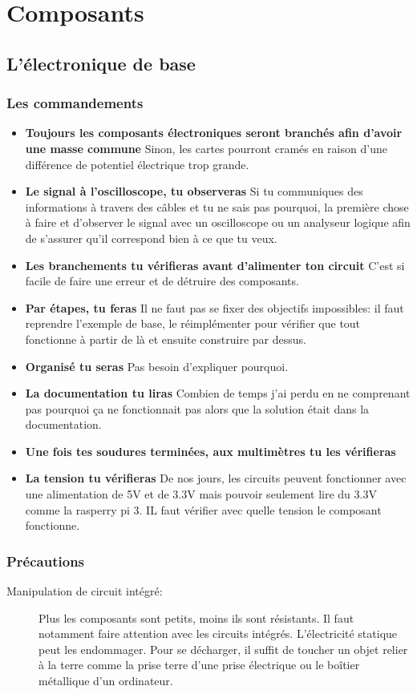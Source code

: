 \documentclass[a4paper, 11pt]{report}
\begin{document}
\part{Composants}

\chapter{L'électronique de base}

\section{Les commandements}
\begin{itemize}
\item \textbf{Toujours les composants électroniques seront branchés afin d'avoir une masse commune}
Sinon, les cartes pourront cramés en raison d'une différence de potentiel électrique trop grande.
\item \textbf{Le signal à l'oscilloscope, tu observeras}
Si tu communiques des informations à travers des câbles et tu ne sais pas pourquoi, la première chose à faire et d'observer le signal avec un oscilloscope ou un analyseur logique afin de s'assurer qu'il correspond bien à ce que tu veux.
\item \textbf{Les branchements tu vérifieras avant d'alimenter ton circuit}
C'est si facile de faire une erreur et de détruire des composants.
\item \textbf{Par étapes, tu feras}
Il ne faut pas se fixer des objectifs impossibles: il faut reprendre l'exemple de base, le réimplémenter pour vérifier que tout fonctionne à partir de là et ensuite construire par dessus.
\item \textbf{Organisé tu seras}
Pas besoin d'expliquer pourquoi.
\item \textbf{La documentation tu liras}
Combien de temps j'ai perdu en ne comprenant pas pourquoi ça ne fonctionnait pas alors que la solution était dans la documentation.
\item \textbf{Une fois tes soudures terminées, aux multimètres tu les vérifieras}
\item \textbf{La tension tu vérifieras}
De nos jours, les circuits peuvent fonctionner avec une alimentation de 5V et de 3.3V mais pouvoir seulement lire du 3.3V comme la rasperry pi 3. IL faut vérifier avec quelle tension le composant fonctionne.
\end{itemize}

\section{Précautions}
\begin{description}
\item[Manipulation de circuit intégré:] Plus les composants sont petits, moins ils sont résistants. Il faut notamment faire attention avec les circuits intégrés. L'électricité statique peut les endommager. Pour se décharger, il suffit de toucher un objet relier à la terre comme la prise terre d'une prise électrique ou le boîtier métallique d'un ordinateur.
\end{description}
\end{document}
